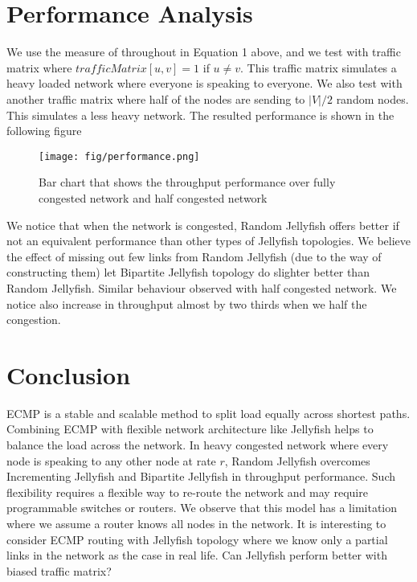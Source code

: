\documentclass[conference]{IEEEtran}
\begin{document}
\section{Performance Analysis}

We use the measure of throughout in Equation 1 above, and we test with traffic matrix where $trafficMatrix[u,v] = 1$ if $u \neq v$. This traffic matrix simulates a heavy loaded network where everyone is speaking to everyone. We also test with another traffic matrix where half of the nodes are sending to $|V|/2$ random nodes. This simulates a less heavy network. The resulted performance is shown in the following figure

\begin{figure}[H]
  \texttt{[image: fig/performance.png]}
  \caption{Bar chart that shows the throughput performance over fully congested network and half congested network}
\end{figure}

We notice that when the network is congested, Random Jellyfish offers better if not an equivalent performance than other types of Jellyfish topologies. We believe the effect of missing out few links from Random Jellyfish (due to the way of constructing them) let Bipartite Jellyfish topology do slighter better than Random Jellyfish. Similar behaviour observed with half congested network. We notice also increase in throughput almost by two thirds when we half the congestion.

\section{Conclusion} 
ECMP is a stable and scalable method to split load equally across shortest paths. Combining ECMP with flexible network architecture like Jellyfish helps to balance the load across the network. In heavy congested network where every node is speaking to any other node at rate $r$, Random Jellyfish overcomes Incrementing Jellyfish and Bipartite Jellyfish in throughput performance. Such flexibility requires a flexible way to re-route the network and may require programmable switches or routers. We observe that this model has a limitation where we assume a router knows all nodes in the network. It is interesting to consider ECMP routing with Jellyfish topology where we know only a partial links in the network as the case in real life. Can Jellyfish perform better with biased traffic matrix?  


\end{document}
